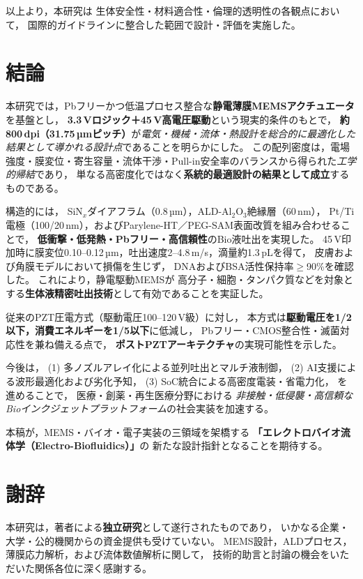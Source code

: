 \documentclass[conference]{IEEEtran}
\begin{document}
\vspace{3pt}
\noindent
以上より，本研究は
生体安全性・材料適合性・倫理的透明性の各観点において，
国際的ガイドラインに整合した範囲で設計・評価を実施した。

\section{結論}
本研究では，Pbフリーかつ低温プロセス整合な\textbf{静電薄膜MEMSアクチュエータ}を基盤とし，
\textbf{3.3\,Vロジック＋45\,V高電圧駆動}という現実的条件のもとで，
\textbf{約800\,dpi（31.75\,µmピッチ）}が\emph{電気・機械・流体・熱設計を総合的に最適化した結果として導かれる設計点}であることを明らかにした。
この配列密度は，電場強度・膜変位・寄生容量・流体干渉・Pull-in安全率のバランスから得られた\emph{工学的帰結}であり，
単なる高密度化ではなく\textbf{系統的最適設計の結果として成立}するものである。

構造的には，
SiN$_x$ダイアフラム（0.8\,µm），ALD-Al$_2$O$_3$絶縁層（60\,nm），
Pt/Ti電極（100/20\,nm），およびParylene-HT／PEG-SAM表面改質を組み合わせることで，
\textbf{低衝撃・低発熱・Pbフリー・高信頼性}のBio液吐出を実現した。
45\,V印加時に膜変位0.10--0.12\,µm，吐出速度2--4.8\,m/s，滴量約1.3\,pLを得て，
皮膚および角膜モデルにおいて損傷を生じず，
DNAおよびBSA活性保持率$\ge$90\%を確認した。
これにより，静電駆動MEMSが
高分子・細胞・タンパク質などを対象とする\textbf{生体液精密吐出技術}として有効であることを実証した。

従来のPZT圧電方式（駆動電圧100–120\,V級）に対し，
本方式は\textbf{駆動電圧を1/2以下，消費エネルギーを1/5以下}に低減し，
Pbフリー・CMOS整合性・滅菌対応性を兼ね備える点で，
\textbf{ポストPZTアーキテクチャ}の実現可能性を示した。

今後は，
(1) 多ノズルアレイ化による並列吐出とマルチ液制御，  
(2) AI支援による波形最適化および劣化予知，  
(3) SoC統合による高密度電装・省電力化，  
を進めることで，
医療・創薬・再生医療分野における
\emph{非接触・低侵襲・高信頼なBioインクジェットプラットフォーム}の社会実装を加速する。

\vspace{4pt}
\noindent
本稿が，MEMS・バイオ・電子実装の三領域を架橋する
\textbf{「エレクトロバイオ流体学（Electro-Biofluidics）」}の
新たな設計指針となることを期待する。

\section*{謝辞}
本研究は，著者による\textbf{独立研究}として遂行されたものであり，
いかなる企業・大学・公的機関からの資金提供も受けていない。
MEMS設計，ALDプロセス，薄膜応力解析，および流体数値解析に関して，
技術的助言と討論の機会をいただいた関係各位に深く感謝する。
\end{document}
